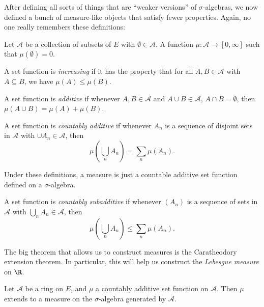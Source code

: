 \documentclass[a4paper]{article}
\begin{document}
After defining all sorts of things that are ``weaker versions'' of $\sigma$-algebras, we now defined a bunch of measure-like objects that satisfy fewer properties. Again, no one really remembers these definitions:

\begin{defi}
  Let $\mathcal{A}$ be a collection of subsets of $E$ with $\emptyset \in \mathcal{A}$. A  function $\mu: \mathcal{A} \to [0, \infty]$ such that $\mu(\emptyset) = 0$.
\end{defi}

\begin{defi}
  A set function is \emph{increasing} if it has the property that for all $A, B \in \mathcal{A}$ with $A \subseteq B$, we have $\mu(A) \leq \mu(B)$.
\end{defi}
\begin{defi}
  A set function is \emph{additive} if whenever $A, B \in \mathcal{A}$ and $A \cup B \in \mathcal{A}$, $A \cap B = \emptyset$, then $\mu(A \cup B) = \mu(A) + \mu(B)$.
\end{defi}

\begin{defi}
  A set function is \emph{countably additive} if whenever $A_n$ is a sequence of disjoint sets in $\mathcal{A}$ with $\cup A_n \in \mathcal{A}$, then
  \[
    \mu\left(\bigcup_n A_n \right) = \sum_n \mu(A_n).
  \]
\end{defi}

Under these definitions, a measure is just a countable additive set function defined on a $\sigma$-algebra.

\begin{defi}
  A set function is \emph{countably subadditive} if whenever $(A_n)$ is a sequence of sets in $\mathcal{A}$ with $\bigcup_n A_n \in \mathcal{A}$, then
  \[
    \mu\left(\bigcup_n A_n\right) \leq \sum_n \mu(A_n).
  \]
\end{defi}

The big theorem that allows us to construct measures is the Caratheodory extension theorem. In particular, this will help us construct the \emph{Lebesgue measure} on $\R$.
\begin{thm}
  Let $\mathcal{A}$ be a ring on $E$, and $\mu$ a countably additive set function on $\mathcal{A}$. Then $\mu$ extends to a measure on the $\sigma$-algebra generated by $\mathcal{A}$.
\end{thm}
\end{document}
